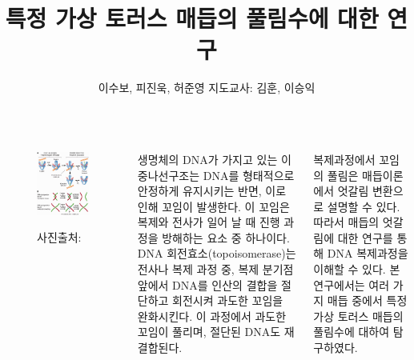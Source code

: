 \documentclass[25pt, a0paper, portrait, margin=0mm, innermargin=15mm,
     blockverticalspace=15mm, colspace=15mm, subcolspace=8mm]{tikzposter}
\title{\sf\textbf{\color{white}특정 가상 토러스 매듭의 풀림수에 대한 연구}}
\author{%
\sf\color{white}
이수보, 피진욱, 허준영\qquad\qquad
지도교사: 김훈, 이승익
}
\institute{%
\sf\color{white}
KAIST부설 한국과학영재학교
}
\def\myem#1{\textsf{\color{BrickRed}#1}}
\begin{document}
\maketitle

\begin{columns}



{
\begin{figure}
\centering
\includegraphics[width=.22\textwidth]{topoisomerase-II.jpeg}

\myem{사진출처: \cite{topo}}
\end{figure}
생명체의 DNA가 가지고 있는 이중나선구조는 DNA를 형태적으로 안정하게 유지시키는 반면, 이로 인해 꼬임이 발생한다.
이 꼬임은 복제와 전사가 일어 날 때 진행 과정을 방해하는 요소 중 하나이다.
\myem{DNA 회전효소(topoisomerase)}는 전사나 복제 과정 중,
복제 분기점 앞에서 DNA를 인산의 결합을 절단하고 회전시켜 과도한 꼬임을 완화시킨다.
이 과정에서 과도한 꼬임이 풀리며, 절단된 DNA도 재결합된다.\cite{campbell}

복제과정에서 꼬임의 풀림은 매듭이론에서 엇갈림 변환으로 설명할 수 있다.
따라서 매듭의 엇갈림에 대한 연구를 통해 DNA 복제과정을 이해할 수 있다.
본 연구에서는 여러 가지 매듭 중에서 특정 가상 토러스 매듭의 풀림수에 대하여 탐구하였다.
}



\end{columns}
\end{document}
